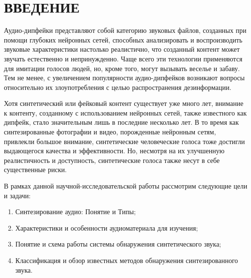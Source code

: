 \part*{ВВЕДЕНИЕ}

Аудио-дипфейки представляют собой категорию звуковых файлов, созданных при помощи глубоких нейронных сетей, способных анализировать и воспроизводить звуковые характеристики настолько реалистично, что созданный контент может звучать естественно и непринужденно. Чаще всего эти технологии применяются для имитации голосов людей, но, кроме того, могут вызывать веселье и забаву. Тем не менее, с увеличением популярности аудио-дипфейков возникают вопросы относительно их злоупотребления с целью распространения дезинформации.

Хотя синтетический или фейковый контент существует уже много лет, внимание к контенту, созданному с использованием нейронных сетей, также известного как дипфейк, стало значительным лишь в последние несколько лет. В то время как синтезированные фотографии и видео, порожденные нейронным сетям, привлекли большое внимание, синтетические человеческие голоса тоже достигли выдающегося качества и эффективности. Но, несмотря на их улучшенную реалистичность и доступность, синтетические голоса также несут в себе существенные риски.

В рамках данной научной-исследовательской работы рассмотрим следующие цели и задачи:

\begin{enumerate}
    \item Синтезирование аудио: Понятие и Типы;
    \item Характеристики и особенности аудиоматериала для изучения;
    \item Понятие и схема работы системы обнаружения синтетического звука;
    \item Классификация и обзор известных методов обнаружения синтезированного звука.
\end{enumerate}


